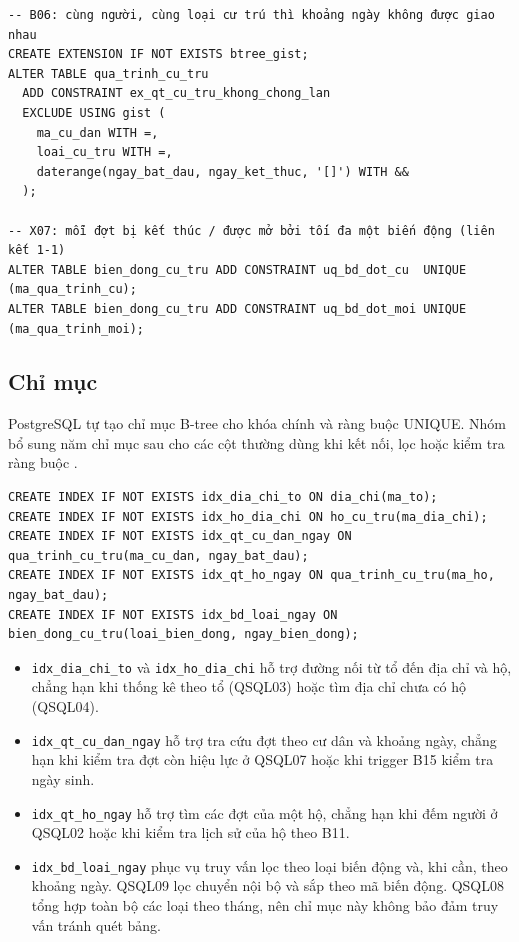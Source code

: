 \begin{lstlisting}[style=sqlvn, caption={Script tạo bảng, ràng buộc B06 và UNIQUE X07 trên PostgreSQL}, label={lst:schema}]
-- B06: cùng người, cùng loại cư trú thì khoảng ngày không được giao nhau
CREATE EXTENSION IF NOT EXISTS btree_gist;
ALTER TABLE qua_trinh_cu_tru
  ADD CONSTRAINT ex_qt_cu_tru_khong_chong_lan
  EXCLUDE USING gist (
    ma_cu_dan WITH =,
    loai_cu_tru WITH =,
    daterange(ngay_bat_dau, ngay_ket_thuc, '[]') WITH &&
  );

-- X07: mỗi đợt bị kết thúc / được mở bởi tối đa một biến động (liên kết 1-1)
ALTER TABLE bien_dong_cu_tru ADD CONSTRAINT uq_bd_dot_cu  UNIQUE (ma_qua_trinh_cu);
ALTER TABLE bien_dong_cu_tru ADD CONSTRAINT uq_bd_dot_moi UNIQUE (ma_qua_trinh_moi);
\end{lstlisting}

\subsection{Chỉ mục}
\label{subsec:chimuc}

PostgreSQL tự tạo chỉ mục B-tree cho khóa chính và ràng buộc UNIQUE. Nhóm bổ sung năm chỉ mục sau cho các cột thường dùng khi kết nối, lọc hoặc kiểm tra ràng buộc \cite{postgres}.

\begin{lstlisting}[style=sqlvn, caption={Năm chỉ mục bổ sung}, label={lst:chimuc}]
CREATE INDEX IF NOT EXISTS idx_dia_chi_to ON dia_chi(ma_to);
CREATE INDEX IF NOT EXISTS idx_ho_dia_chi ON ho_cu_tru(ma_dia_chi);
CREATE INDEX IF NOT EXISTS idx_qt_cu_dan_ngay ON qua_trinh_cu_tru(ma_cu_dan, ngay_bat_dau);
CREATE INDEX IF NOT EXISTS idx_qt_ho_ngay ON qua_trinh_cu_tru(ma_ho, ngay_bat_dau);
CREATE INDEX IF NOT EXISTS idx_bd_loai_ngay ON bien_dong_cu_tru(loai_bien_dong, ngay_bien_dong);
\end{lstlisting}

\begin{itemize}[leftmargin=*]
    \item \texttt{idx\_dia\_chi\_to} và \texttt{idx\_ho\_dia\_chi} hỗ trợ đường nối từ tổ đến địa chỉ và hộ, chẳng hạn khi thống kê theo tổ (QSQL03) hoặc tìm địa chỉ chưa có hộ (QSQL04).
    \item \texttt{idx\_qt\_cu\_dan\_ngay} hỗ trợ tra cứu đợt theo cư dân và khoảng ngày, chẳng hạn khi kiểm tra đợt còn hiệu lực ở QSQL07 hoặc khi trigger B15 kiểm tra ngày sinh.
    \item \texttt{idx\_qt\_ho\_ngay} hỗ trợ tìm các đợt của một hộ, chẳng hạn khi đếm người ở QSQL02 hoặc khi kiểm tra lịch sử của hộ theo B11.
    \item \texttt{idx\_bd\_loai\_ngay} phục vụ truy vấn lọc theo loại biến động và, khi cần, theo khoảng ngày. QSQL09 lọc chuyển nội bộ và sắp theo mã biến động. QSQL08 tổng hợp toàn bộ các loại theo tháng, nên chỉ mục này không bảo đảm truy vấn tránh quét bảng.
\end{itemize}

